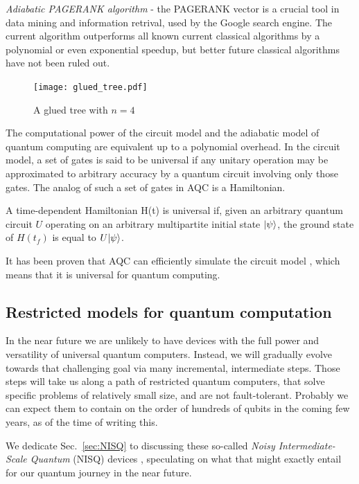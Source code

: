 \emph{Adiabatic PAGERANK algorithm} - the PAGERANK vector is a crucial tool in data mining and information retrival, used by the Google search engine. The current algorithm outperforms all known current classical algorithms by a polynomial or even exponential speedup, but better future classical algorithms have not been ruled out.

\begin{figure}[!htbp]
	\texttt{[image: glued\_tree.pdf]}
	\captionspacefig \caption{A glued tree with $n=4$} \label{fig:glued_tree}
\end{figure}


The computational power of the circuit model and the adiabatic model of quantum computing are equivalent up to a polynomial overhead. In the circuit model, a set of gates is said to be universal if any unitary operation may be approximated to arbitrary accuracy by a quantum circuit involving only those gates. The analog of such a set of gates in AQC is a Hamiltonian.

A time-dependent Hamiltonian H(t) is universal if, given an arbitrary quantum circuit $U$ operating on an arbitrary multipartite initial state $|\psi\rangle$, the ground state of $H(t_f)$ is equal to $U|\psi\rangle$.

It has been proven that AQC can efficiently simulate the circuit model \cite{}, which means that it is universal for quantum computing.



%
%

\subsection{Restricted models for quantum computation} \label{sec:restricted_models} 

In the near future we are unlikely to have devices with the full power and versatility of universal quantum computers. Instead, we will gradually evolve towards that challenging goal via many incremental, intermediate steps. Those steps will take us along a path of restricted quantum computers, that solve specific problems of relatively small size, and are not fault-tolerant. Probably we can expect them to contain on the order of hundreds of qubits in the coming few years, as of the time of writing this.

We dedicate Sec.~\ref{sec:NISQ} to discussing these so-called \textit{Noisy Intermediate-Scale Quantum} (NISQ) devices \cite{bib:preskill2018quantum}, speculating on what that might exactly entail for our quantum journey in the near future.

